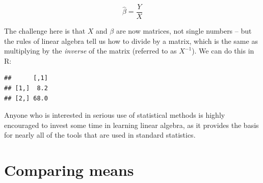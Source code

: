 \documentclass[
  12pt,
]{book}
\newenvironment{Shaded}{\begin{snugshade}}{\end{snugshade}}
\newcommand{\AttributeTok}[1]{\textcolor[rgb]{0.77,0.63,0.00}{#1}}
\newcommand{\CommentTok}[1]{\textcolor[rgb]{0.56,0.35,0.01}{\textit{#1}}}
\newcommand{\DecValTok}[1]{\textcolor[rgb]{0.00,0.00,0.81}{#1}}
\newcommand{\FunctionTok}[1]{\textcolor[rgb]{0.00,0.00,0.00}{#1}}
\newcommand{\NormalTok}[1]{#1}
\newcommand{\OtherTok}[1]{\textcolor[rgb]{0.56,0.35,0.01}{#1}}
\newcommand{\SpecialCharTok}[1]{\textcolor[rgb]{0.00,0.00,0.00}{#1}}
\begin{document}
\[
\hat{\beta} = \frac{Y}{X}
\]

The challenge here is that \(X\) and \(\beta\) are now matrices, not single numbers -- but the rules of linear algebra tell us how to divide by a matrix, which is the same as multiplying by the \emph{inverse} of the matrix (referred to as \(X^{-1}\)). We can do this in R:

\begin{Shaded}
\end{Shaded}

\begin{verbatim}
##      [,1]
## [1,]  8.2
## [2,] 68.0
\end{verbatim}

Anyone who is interested in serious use of statistical methods is highly encouraged to invest some time in learning linear algebra, as it provides the basis for nearly all of the tools that are used in standard statistics.

\hypertarget{comparing-means}{%
\chapter{Comparing means}\label{comparing-means}}
\end{document}
